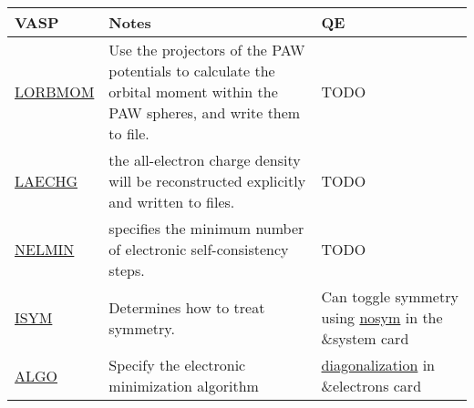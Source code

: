 \documentclass[12pt]{article}
\begin{document}
\newpage
\begin{center}
\begin{table}[ht]
\begin{tabularx}{\linewidth}{|>{\RaggedRight}p{2.5cm}|x|x|}\hline
 VASP  & Notes & QE \\ \hline

 \href{https://www.vasp.at/wiki/index.php/LORBMOM}{LORBMOM} &
 Use the projectors of the PAW potentials to calculate the orbital moment within the PAW spheres, and write them to file. &
 TODO \\ \hline
 
 \href{https://www.vasp.at/wiki/index.php/LAECHG}{LAECHG} &
 the all-electron charge density will be reconstructed explicitly and written to files. &
 TODO \\ \hline
 
 \href{https://www.vasp.at/wiki/index.php/NELMIN}{NELMIN} &
 specifies the minimum number of electronic self-consistency steps. &
 TODO \\ \hline
 
 \href{https://www.vasp.at/wiki/index.php/ISYM}{ISYM} &
 Determines how to treat symmetry. &
 Can toggle symmetry using \href{https://www.quantum-espresso.org/Doc/INPUT_PW.html#idm768}{nosym} in the \&system card \\ \hline
 
 \href{https://www.vasp.at/wiki/index.php/ALGO}{ALGO} &
 Specify the electronic minimization algorithm &
 \href{https://www.quantum-espresso.org/Doc/INPUT_PW.html#idm768}{diagonalization} in \&electrons card \\ \hline

\end{tabularx}
\end{table}
\end{center}
\end{document}
